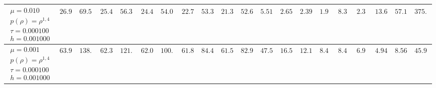 \begin{tabular}{*{19}{|c}|c}
\hline
$\begin{array}{c}\mu = 0.010\\p(\rho) = \rho^{1,4}\\\tau = 0.000100\\h = 0.001000\end{array}$&$26.993900$ &$69.534200$ &$25.461300$ &$56.303700$ &$24.490700$ &$54.089000$ &$22.728800$ &$53.352600$ &$21.308500$ &$52.618300$ &$5.518900$ &$2.659300$ &$2.399200$ &$1.917700$ &$8.365300$ &$2.386200$ &$13.619400$ &$57.145700$ &$375.590400$ \\
\hline
$\begin{array}{c}\mu = 0.001\\p(\rho) = \rho^{1,4}\\\tau = 0.000100\\h = 0.001000\end{array}$&$63.920300$ &$138.264900$ &$62.355200$ &$121.370100$ &$62.042200$ &$100.722900$ &$61.856700$ &$84.448000$ &$61.590600$ &$82.976900$ &$47.557900$ &$16.585800$ &$12.150600$ &$8.469100$ &$8.464100$ &$6.989400$ &$4.941600$ &$8.564200$ &$45.968300$ \\
\hline
\end{tabular}

